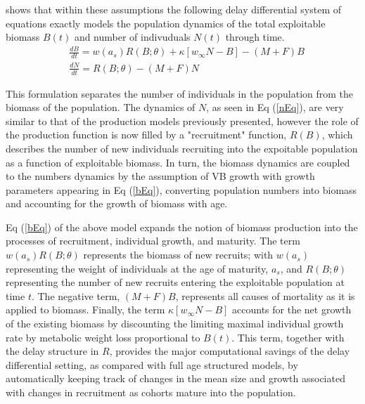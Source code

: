 %
\cite{walters_continuous_2020} shows that within these assumptions the
following delay differential system of equations exactly models the population
dynamics of the total exploitable biomass $B(t)$ and number of indivuduals $N(t)$
through time.
%
\begin{align}%
&\frac{dB}{dt} = w(a_s)R(B;\theta) + \kappa \left[w_\infty N-B\right] - (M+F)B \label{bEq}\\
&\frac{dN}{dt} = R(B;\theta) - (M+F)N \label{nEq}
\end{align}

%
This formulation separates the number of individuals in the population from the
biomass of the population. The dynamics of $N$, as seen in Eq (\ref{nEq}), are
very similar to that of the {\color{green}production models previously presented}, 
however the role of the production function is now filled by a "recruitment"
function, $R(B)$, which describes the number of new individuals recruiting into the
expoitable population as a function of exploitable biomass. In turn, the biomass
dynamics are coupled to the numbers dynamics by the assumption of VB growth with
growth parameters appearing in Eq (\ref{bEq}), converting population numbers
into biomass and accounting for the growth of biomass with age.

%
Eq (\ref{bEq}) of the above model expands the notion of biomass production into the
processes of recruitment, individual growth, and maturity. The term $w(a_s)R(B;\theta)$
represents the biomass of new recruits; with $w(a_s)$ representing the weight of individuals
at the age of maturity, $a_s$, and $R(B;\theta)$ representing the number of new recruits
entering the exploitable population at time $t$. The negative term, $(M+F)B$, represents all
causes of mortality as it is applied to biomass. Finally, the term $\kappa \left[w_\infty N-B\right]$
accounts for the net growth of the existing biomass by discounting the limiting maximal individual
growth rate by metabolic weight loss proportional to $B(t)$. This term, together with the delay
structure in $R$, provides the major computational savings of the delay differential setting, as
compared with full age structured models, by automatically keeping track of changes in the mean
size and growth associated with changes in recruitment as cohorts mature into the population.

